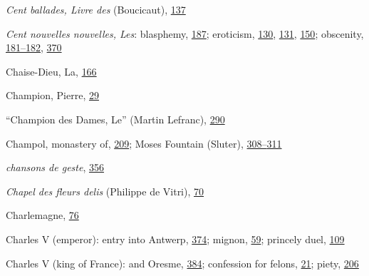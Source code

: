 \emph{Cent ballades, Livre des} (Boucicaut),
\protect\hyperlink{11_Chapter_Four__THE_FORMS_OF_LOVE.xhtmlux5cux23page_137}{137}

\emph{Cent nouvelles nouvelles, Les}: blasphemy,
\protect\hyperlink{13_Chapter_Six__THE_DEPICTION_OF_TH.xhtmlux5cux23page_187}{187};
eroticism,
\protect\hyperlink{11_Chapter_Four__THE_FORMS_OF_LOVE.xhtmlux5cux23page_130}{130},
\protect\hyperlink{11_Chapter_Four__THE_FORMS_OF_LOVE.xhtmlux5cux23page_131}{131},
\protect\hyperlink{11_Chapter_Four__THE_FORMS_OF_LOVE.xhtmlux5cux23page_150}{150};
obscenity,
\protect\hyperlink{13_Chapter_Six__THE_DEPICTION_OF_TH.xhtmlux5cux23page_181}{181--}\protect\hyperlink{13_Chapter_Six__THE_DEPICTION_OF_TH.xhtmlux5cux23page_182}{182},
\protect\hyperlink{21_Chapter_Thirteen__IMAGE_AND_WORD.xhtmlux5cux23page_370}{370}

Chaise-Dieu, La,
\protect\hyperlink{12_Chapter_Five__THE_VISION_OF_DEAT.xhtmlux5cux23page_166}{166}

Champion, Pierre,
\protect\hyperlink{08_Chapter_One__THE_PASSIONATE_INTE.xhtmlux5cux23page_29}{29}

``Champion des Dames, Le'' (Martin Lefranc),
\protect\hyperlink{18_Chapter_Eleven__THE_FORMS_OF_THO.xhtmlux5cux23page_290}{290}

Champol, monastery of,
\protect\hyperlink{14_Chapter_Seven__THE_PIOUS_PERSONA.xhtmlux5cux23page_209}{209};
Moses Fountain (Sluter),
\protect\hyperlink{20_ILLUSTRATIONS_FOLLOW_PAGE.xhtmlux5cux23page_308}{308--}\protect\hyperlink{20_ILLUSTRATIONS_FOLLOW_PAGE.xhtmlux5cux23page_311}{311}

\emph{\protect\hypertarget{25_INDEX.xhtmlux5cux23page_454}{}{}chansons
de geste},
\protect\hyperlink{21_Chapter_Thirteen__IMAGE_AND_WORD.xhtmlux5cux23page_356}{356}

\emph{Chapel des fleurs delis} (Philippe de Vitri),
\protect\hyperlink{10_Chapter_Three__THE_HEROIC_DREAM.xhtmlux5cux23page_70}{70}

Charlemagne,
\protect\hyperlink{10_Chapter_Three__THE_HEROIC_DREAM.xhtmlux5cux23page_76}{76}

Charles V (emperor): entry into Antwerp,
\protect\hyperlink{21_Chapter_Thirteen__IMAGE_AND_WORD.xhtmlux5cux23page_374}{374};
mignon,
\protect\hyperlink{09_Chapter_Two__THE_CRAVING_FOR_A_M.xhtmlux5cux23page_59}{59};
princely duel,
\protect\hyperlink{10_Chapter_Three__THE_HEROIC_DREAM.xhtmlux5cux23page_109}{109}

Charles V (king of France): and Oresme,
\protect\hyperlink{22_Chapter_Fourteen__THE_COMING_OF.xhtmlux5cux23page_384}{384};
confession for felons,
\protect\hyperlink{08_Chapter_One__THE_PASSIONATE_INTE.xhtmlux5cux23page_21}{21};
piety,
\protect\hyperlink{14_Chapter_Seven__THE_PIOUS_PERSONA.xhtmlux5cux23page_206}{206}

